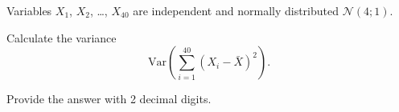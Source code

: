 
\begin{question}
Variables \(X_1\), \(X_2\), \ldots, \(X_{40}\) are independent and normally distributed \(\mathcal{N}(4; 1)\).

Calculate the variance
\[
\mathrm{Var}\left(\sum_{i=1}^{40}(X_i - \bar X)^2\right).
\]

Provide the answer with 2 decimal digits.
\end{question}


